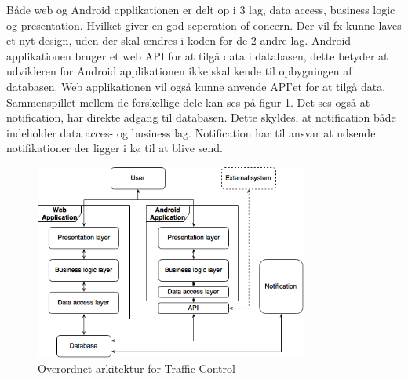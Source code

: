 Både web og Android applikationen er delt op i 3 lag, data access, business logic og presentation. Hvilket giver en god seperation of concern. Der vil fx kunne laves et nyt design, uden der skal ændres i koden for de 2 andre lag. Android applikationen bruger et web API for at tilgå data i databasen, dette betyder at udvikleren for Android applikationen ikke skal kende til opbygningen af databasen. Web applikationen vil også kunne anvende API'et for at tilgå data.
\newline
Sammenspillet mellem de forskellige dele kan ses på figur \ref{fig:OverordnetArkitektur}. Det ses også at notification, har direkte adgang til databasen. Dette skyldes, at notification både indeholder data acces- og business lag. Notification har til ansvar at udsende notifikationer der ligger i kø til at blive send.

\begin{figure}[htbp] %
	\centering
	\includegraphics[width=0.8\textwidth]{../Dokumentation/Arkitektur/OverordnetArkitektur.png}
	\caption{Overordnet arkitektur for Traffic Control}
	\label{fig:OverordnetArkitektur}
\end{figure}

\clearpage
